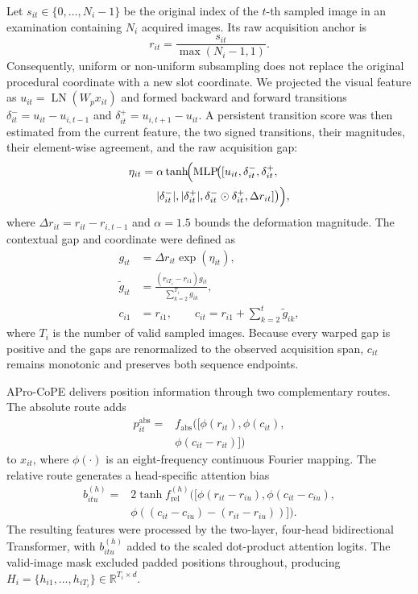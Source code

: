 \documentclass[Afour,sagev,times]{sagej}
\begin{document}
Let $s_{it}\in\{0,\ldots,N_i-1\}$ be the original index of the $t$-th sampled image in an examination containing $N_i$ acquired images. Its raw acquisition anchor is
\begin{equation}
r_{it}=\frac{s_{it}}{\max(N_i-1,1)}.
\end{equation}
Consequently, uniform or non-uniform subsampling does not replace the original procedural coordinate with a new slot coordinate. We projected the visual feature as $u_{it}=\operatorname{LN}(W_px_{it})$ and formed backward and forward transitions $\delta^-_{it}=u_{it}-u_{i,t-1}$ and $\delta^+_{it}=u_{i,t+1}-u_{it}$. A persistent transition score was then estimated from the current feature, the two signed transitions, their magnitudes, their element-wise agreement, and the raw acquisition gap:
\begin{equation}
\begin{aligned}
\eta_{it}={}&\alpha\tanh\!\Bigl(\operatorname{MLP}\!\bigl(
[u_{it},\delta^-_{it},\delta^+_{it},\\
&|\delta^-_{it}|,|\delta^+_{it}|,
\delta^-_{it}\odot\delta^+_{it},\Delta r_{it}]\bigr)\Bigr),
\end{aligned}
\end{equation}
where $\Delta r_{it}=r_{it}-r_{i,t-1}$ and $\alpha=1.5$ bounds the deformation magnitude. The contextual gap and coordinate were defined as
\begin{align}
g_{it}&=\Delta r_{it}\exp(\eta_{it}),\\
\widetilde g_{it}&=\frac{(r_{iT_i}-r_{i1})g_{it}}{\sum_{k=2}^{T_i}g_{ik}},\\
c_{i1}&=r_{i1},\qquad c_{it}=r_{i1}+\sum_{k=2}^{t}\widetilde g_{ik},
\end{align}
where $T_i$ is the number of valid sampled images. Because every warped gap is positive and the gaps are renormalized to the observed acquisition span, $c_{it}$ remains monotonic and preserves both sequence endpoints.

APro-CoPE delivers position information through two complementary routes. The absolute route adds
\begin{equation}
\begin{aligned}
p^{\mathrm{abs}}_{it}={}&f_{\mathrm{abs}}([\phi(r_{it}),\phi(c_{it}),\\
&\phi(c_{it}-r_{it})])
\end{aligned}
\end{equation}
to $x_{it}$, where $\phi(\cdot)$ is an eight-frequency continuous Fourier mapping. The relative route generates a head-specific attention bias
\begin{equation}
\begin{aligned}
b^{(h)}_{itu}={}&2\tanh f^{(h)}_{\mathrm{rel}}\bigl([\phi(r_{it}-r_{iu}),
\phi(c_{it}-c_{iu}),\\
&\phi((c_{it}-c_{iu})-(r_{it}-r_{iu}))]\bigr).
\end{aligned}
\end{equation}
The resulting features were processed by the two-layer, four-head bidirectional Transformer, with $b^{(h)}_{itu}$ added to the scaled dot-product attention logits. The valid-image mask excluded padded positions throughout, producing $H_i=\{h_{i1},\ldots,h_{iT_i}\}\in\mathbb{R}^{T_i\times d}$.
\end{document}
